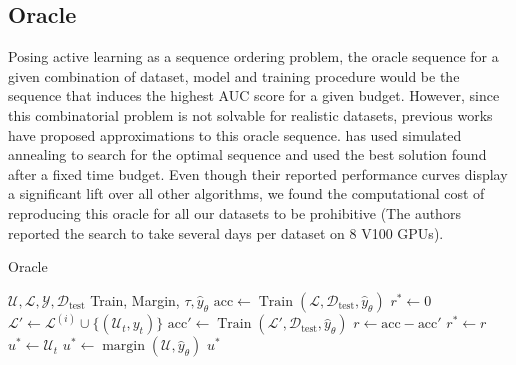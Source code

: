 \documentclass[]{article}
\begin{document}
\subsection{Oracle}\label{sec:oracle}
Posing active learning as a sequence ordering problem, the oracle sequence for a given combination of dataset, model and training procedure would be the sequence that induces the highest AUC score for a given budget.
However, since this combinatorial problem is not solvable for realistic datasets, previous works have proposed approximations to this oracle sequence.
\cite{zhou2021towards} has used simulated annealing to search for the optimal sequence and used the best  solution found after a fixed time budget. 
Even though their reported performance curves display a significant lift over all other algorithms, we found the computational cost of reproducing this oracle for all our datasets to be prohibitive (The authors reported the search to take several days per dataset on 8 V100 GPUs).
\begin{minipage}{0.47\textwidth}
	\begin{algorithm}[H]
		\caption{Oracle}\label{alg:oracle}
		\begin{algorithmic}[1]
			\Require $\mathcal{U}, \mathcal{L}, \mathcal{Y}, \mathcal{D}_\text{test}$ Train, Margin, $\tau, \hat y_\theta$ 
			\State $\text{acc} \gets \operatorname{Train}(\mathcal{L}, \mathcal{D}_\text{test}, \hat y_\theta)$ 
			\State $r^* \gets 0$
			\State $\mathcal{L}' \gets \mathcal{L}^{(i)} \cup \{(\mathcal{U}_t, y_t)\}$
			\State $\text{acc}' \gets \operatorname{Train}(\mathcal{L}', \mathcal{D}_\text{test}, \hat y_\theta)$  
			\State $r \gets \text{acc} - \text{acc}'$
			\State $r^* \gets r$
			\State $u^* \gets \mathcal{U}_t$
			\EndIf
			\EndFor
			\State $u^* \gets \operatorname{margin}(\mathcal{U}, \hat y_\theta)$
			\EndIf
			\Return $u^*$
		\end{algorithmic}
	\end{algorithm}
\end{minipage}
\hspace{2mm}
\end{document}
